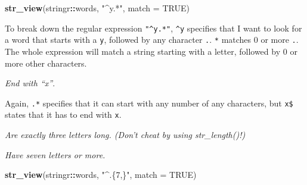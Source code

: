 \documentclass[]{article}
\newenvironment{Shaded}{\begin{snugshade}}{\end{snugshade}}
\newcommand{\KeywordTok}[1]{\textcolor[rgb]{0.13,0.29,0.53}{\textbf{#1}}}
\newcommand{\DataTypeTok}[1]{\textcolor[rgb]{0.13,0.29,0.53}{#1}}
\newcommand{\StringTok}[1]{\textcolor[rgb]{0.31,0.60,0.02}{#1}}
\newcommand{\OtherTok}[1]{\textcolor[rgb]{0.56,0.35,0.01}{#1}}
\newcommand{\OperatorTok}[1]{\textcolor[rgb]{0.81,0.36,0.00}{\textbf{#1}}}
\newcommand{\NormalTok}[1]{#1}
\theoremstyle{definition}
\theoremstyle{definition}
\theoremstyle{definition}
\theoremstyle{remark}
\begin{document}
\begin{Shaded}
\begin{Highlighting}[]
\KeywordTok{str_view}\NormalTok{(stringr}\OperatorTok{::}\NormalTok{words, }\StringTok{"^y.*"}\NormalTok{, }\DataTypeTok{match =} \OtherTok{TRUE}\NormalTok{)}
\end{Highlighting}
\end{Shaded}

\hypertarget{htmlwidget-2e68a2ded83d2ef6a76b}{}

To break down the regular expression \texttt{"\^{}y.*"}, \texttt{\^{}y}
specifies that I want to look for a word that starts with a \texttt{y},
followed by any character \texttt{.}. \texttt{*} matches 0 or more
\texttt{.}. The whole expression will match a string starting with a
letter, followed by 0 or more other characters.

\emph{End with ``x''}.

\begin{Shaded}
\end{Shaded}

\hypertarget{htmlwidget-77e6dbe6f3a2db0e91c0}{}

Again, \texttt{.*} specifies that it can start with any number of any
characters, but \texttt{x\$} states that it has to end with \texttt{x}.

\emph{Are exactly three letters long. (Don't cheat by using
str\_length()!)}

\begin{Shaded}
\end{Shaded}

\hypertarget{htmlwidget-249e629ff9248a23d145}{}

\emph{Have seven letters or more.}

\begin{Shaded}
\begin{Highlighting}[]
\KeywordTok{str_view}\NormalTok{(stringr}\OperatorTok{::}\NormalTok{words, }\StringTok{"^.\{7,\}"}\NormalTok{, }\DataTypeTok{match =} \OtherTok{TRUE}\NormalTok{)}
\end{Highlighting}
\end{Shaded}
\end{document}
